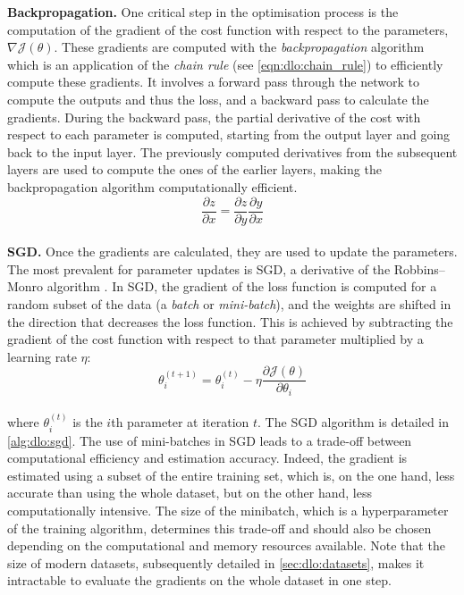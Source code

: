 \noindent \textbf{Backpropagation.} One critical step in the optimisation
process is the computation of the gradient of the cost function with respect to
the parameters, $\nabla \mathcal{J}(\theta)$. These gradients are computed with
the \emph{backpropagation} algorithm \cite{rumelhart1986learning} which is an
application of the \emph{chain rule} (see \cref{eqn:dlo:chain_rule}) to
efficiently compute these gradients. It involves a forward pass through the
network to compute the outputs and thus the loss, and a backward pass to
calculate the gradients. During the backward pass, the partial derivative of the
cost with respect to each parameter is computed, starting from the output layer
and going back to the input layer. The previously computed derivatives from the
subsequent layers are used to compute the ones of the earlier layers,  
making the backpropagation algorithm computationally efficient.\\

\begin{equation}
  \label{eqn:dlo:chain_rule}
  \frac{\partial z}{\partial x} = \frac{\partial z}{\partial y} \frac{\partial y}{\partial x}
\end{equation}\\

\noindent \textbf{\acl{SGD}.} Once the gradients are calculated, they are
used to update the parameters. The most prevalent for parameter updates is
\acf{SGD}, a derivative of the Robbins–Monro algorithm
\cite{robbins1951stochastic}. In \ac{SGD}, the gradient of the loss function is
computed for a random subset of the data (a \emph{batch} or \emph{mini-batch}),
and the weights are shifted in the direction that decreases the loss function.
This is achieved by subtracting the gradient of the cost function with respect
to that parameter multiplied by a learning rate $\eta$:\\

\begin{equation}
\label{eqn:dlo:sgd_update}
\theta_i^{(t+1)} = \theta_i^{(t)} - \eta \frac{\partial \mathcal{J}(\theta)}{\partial \theta_i}
\end{equation}\\

\noindent where $\theta_i^{(t)}$ is the $i$th parameter at iteration $t$. The
\ac{SGD} algorithm is detailed in \cref{alg:dlo:sgd}. The use of mini-batches in
\ac{SGD} leads to a trade-off between computational efficiency and estimation
accuracy. Indeed, the gradient is estimated using a subset of the entire
training set, which is, on the one hand, less accurate than using the whole
dataset, but on the other hand, less computationally intensive. The size of the
minibatch, which is a hyperparameter of the training algorithm, determines this
trade-off and should also be chosen depending on the computational and memory
resources available. Note that the size of modern datasets, subsequently
detailed in \cref{sec:dlo:datasets}, makes it intractable to evaluate the
gradients on the whole dataset in one step.\\

